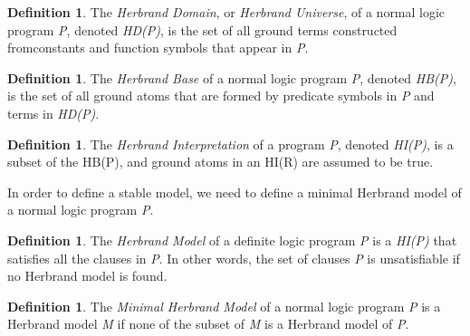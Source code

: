 \documentclass[11pt,twoside]{report}
\theoremstyle{plain}
\theoremstyle{definition}
\newtheorem{defn}[thm]{Definition} %
\begin{document}
\begin{defn}
\label{def:herbrand_domain}
The \textit{Herbrand Domain}, or \textit{Herbrand Universe}, of a normal logic program \textit{P}, denoted \textit{HD(P)}, is the set of all ground terms constructed fromconstants and function symbols that appear in \textit{P}.
\end{defn}

\begin{defn}
\label{def:herbrand_base}
The \textit{Herbrand Base} of a normal logic program \textit{P}, denoted \textit{HB(P)}, is the set of all ground atoms that are formed by predicate symbols in \textit{P} and terms in \textit{HD(P)}.
\end{defn}

\begin{defn}
The \textit{Herbrand Interpretation} of a program \textit{P}, denoted \textit{HI(P)}, is a subset of the HB(P), and ground atoms in an HI(R) are assumed to be true.
\end{defn}

In order to define a stable model, we need to define a minimal Herbrand model of a normal logic program \textit{P}.

\begin{defn}
\label{def:herbrand_model}
The \textit{Herbrand Model} of a definite logic program \textit{P} is a \textit{HI(P)} that satisfies all the clauses in \textit{P}. In other words, the set of clauses \textit{P} is unsatisfiable if no Herbrand model is found.
\end{defn}

\begin{defn}
\label{def:minimal_herbrand_model}
The \textit{Minimal Herbrand Model} of a normal logic program \textit{P} is a Herbrand model \textit{M} if none of the subset of \textit{M} is a Herbrand model of \textit{P}.
\end{defn}


\end{document}
